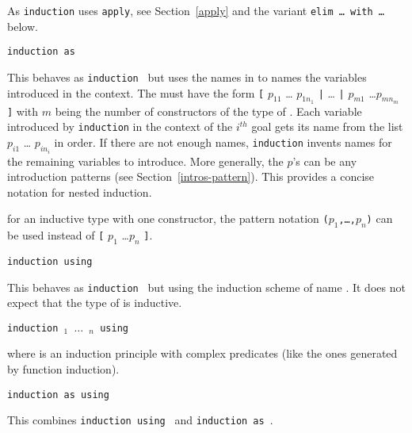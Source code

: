 \begin{ErrMsgs}
\item {}
\item {}
  
  As {\tt induction} uses {\tt apply}, see Section~\ref{apply} and
  the variant {\tt elim \dots\ with \dots} below.
\end{ErrMsgs}

\begin{Variants}
\item{\tt induction {\term} as {\intropattern}}
  
  This behaves as {\tt induction {\term}} but uses the names in
  {\intropattern} to names the variables introduced in the context.
  The {\intropattern} must have the form {\tt [} $p_{11}$ \ldots
  $p_{1n_1}$ {\tt |} {\ldots} {\tt |} $p_{m1}$ \ldots $p_{mn_m}$ {\tt
    ]} with $m$ being the number of constructors of the type of
  {\term}. Each variable introduced by {\tt induction} in the context
  of the $i^{th}$ goal gets its name from the list $p_{i1}$ \ldots
  $p_{in_i}$ in order. If there are not enough names, {\tt induction}
  invents names for the remaining variables to introduce. More
  generally, the $p$'s can be any introduction patterns (see
  Section~\ref{intros-pattern}). This provides a concise notation for
  nested induction.

\Rem for an inductive type with one constructor, the pattern notation
{\tt ($p_{1}$,\ldots,$p_{n}$)} can be used instead of
{\tt [} $p_{1}$ \ldots $p_{n}$ {\tt ]}.

\item {\tt induction {\term} using {\qualid}}

  This behaves as {\tt induction {\term}} but using the induction
scheme of name {\qualid}. It does not expect that the type of
{\term} is inductive.

\item \texttt{induction {\term}$_1$ $\ldots$ {\term}$_n$ using {\qualid}}

  where {\qualid} is an induction principle with complex predicates
  (like the ones generated by function induction).

\item {\tt induction {\term} as {\intropattern} using {\qualid}}

  This combines {\tt induction {\term} using {\qualid}}
and {\tt induction {\term} as {\intropattern}}.


\end{Variants}
